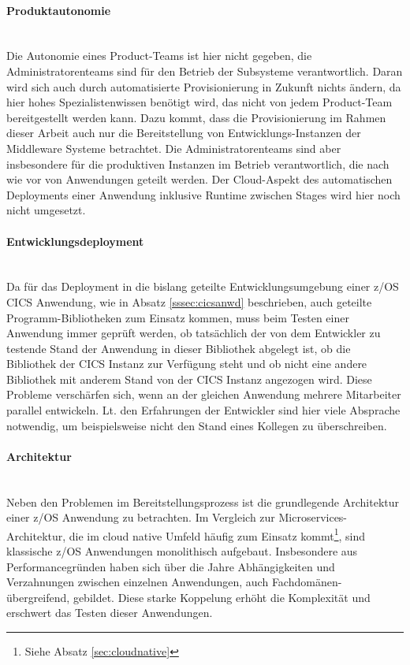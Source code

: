 \paragraph{Produktautonomie}~\\
Die Autonomie eines Product-Teams ist hier nicht gegeben, die Administratorenteams sind für den Betrieb der Subsysteme verantwortlich.
Daran wird sich auch durch automatisierte Provisionierung in Zukunft nichts ändern, da hier hohes Spezialistenwissen benötigt wird, das nicht von jedem Product-Team bereitgestellt werden kann. 
Dazu kommt, dass die Provisionierung im Rahmen dieser Arbeit auch nur die Bereitstellung von Entwicklungs-Instanzen der Middleware Systeme betrachtet. 
Die Administratorenteams sind aber insbesondere für die produktiven Instanzen im Betrieb verantwortlich, die nach wie vor von Anwendungen geteilt werden.  
Der Cloud-Aspekt des automatischen Deployments einer Anwendung inklusive Runtime zwischen Stages wird hier noch nicht umgesetzt.

\paragraph{Entwicklungsdeployment}~\\
Da für das Deployment in die bislang geteilte Entwicklungsumgebung einer z/OS CICS Anwendung, wie in Absatz \ref{sssec:cicsanwd} beschrieben, auch geteilte Programm-Bibliotheken zum Einsatz kommen, muss beim Testen einer Anwendung immer geprüft werden, ob tatsächlich der von dem Entwickler zu testende Stand der Anwendung in dieser Bibliothek abgelegt ist, ob die Bibliothek der CICS Instanz zur Verfügung steht und ob nicht eine andere Bibliothek mit anderem Stand von der CICS Instanz angezogen wird.
Diese Probleme verschärfen sich, wenn an der gleichen Anwendung mehrere Mitarbeiter parallel entwickeln. 
Lt. den Erfahrungen der Entwickler sind hier viele Absprache notwendig, um beispielsweise nicht den Stand eines Kollegen zu überschreiben.

\paragraph{Architektur}~\\
Neben den Problemen im Bereitstellungsprozess ist die grundlegende Architektur einer z/OS Anwendung zu betrachten.
Im Vergleich zur \glqq Microservices\grqq-Architektur, die im cloud native Umfeld häufig zum Einsatz kommt\footnote{Siehe Absatz \ref{sec:cloudnative}}, sind klassische z/OS Anwendungen monolithisch aufgebaut.
Insbesondere aus Performancegründen haben sich über die Jahre Abhängigkeiten und Verzahnungen zwischen einzelnen Anwendungen, auch Fachdomänen-übergreifend, gebildet.
Diese starke Koppelung erhöht die Komplexität und erschwert das Testen dieser Anwendungen.

